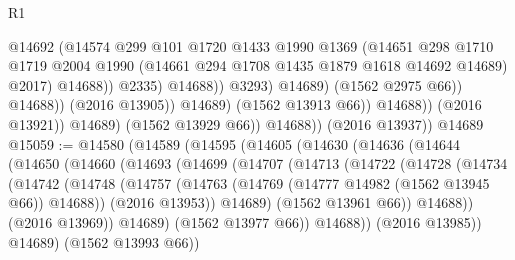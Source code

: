 \begin{lexlean}{R1}
\begin{coremodule}
                                            @14692
                                            (@14574
                                              @299
                                              @101
                                              @1720
                                              @1433
                                              @1990
                                              @1369
                                              (@14651
                                                @298
                                                @1710
                                                @1719
                                                @2004
                                                @1990
                                                (@14661 @294 @1708 @1435 @1879 @1618 @14692 @14689)
                                                @2017)
                                              @14688))
                                          @2335)
                                        @14688))
                                    @3293)
                                  @14689)
                                (@1562 @2975 @66))
                              @14688))
                          (@2016 @13905))
                        @14689)
                      (@1562 @13913 @66))
                    @14688))
                (@2016 @13921))
              @14689)
            (@1562 @13929 @66))
          @14688))
      (@2016 @13937))
    @14689
@15059 := @14580
    (@14589
      (@14595
        (@14605
          (@14630
            (@14636
              (@14644
                (@14650
                  (@14660
                    (@14693
                      (@14699
                        (@14707
                          (@14713
                            (@14722
                              (@14728
                                (@14734
                                  (@14742
                                    (@14748
                                      (@14757
                                        (@14763 (@14769 (@14777 @14982 (@1562 @13945 @66)) @14688))
                                        (@2016 @13953))
                                      @14689)
                                    (@1562 @13961 @66))
                                  @14688))
                              (@2016 @13969))
                            @14689)
                          (@1562 @13977 @66))
                        @14688))
                    (@2016 @13985))
                  @14689)
                (@1562 @13993 @66))

\end{coremodule}
\end{lexlean}
